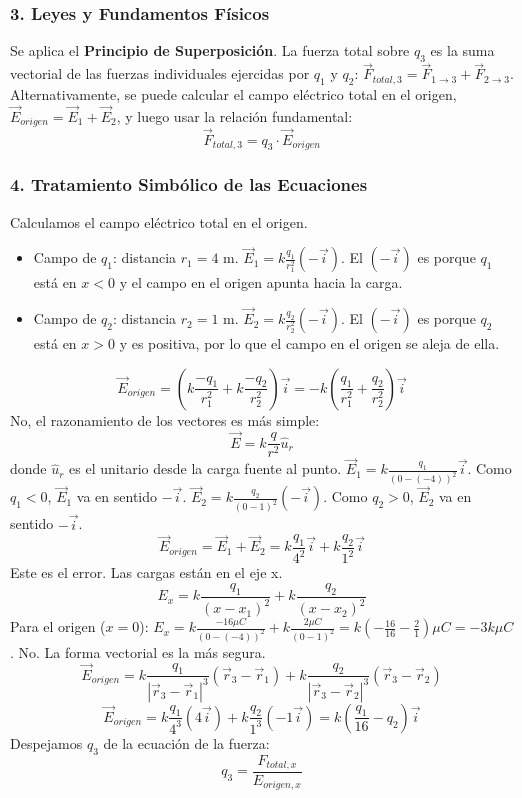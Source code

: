 \subsubsection*{3. Leyes y Fundamentos Físicos}
Se aplica el \textbf{Principio de Superposición}. La fuerza total sobre $q_3$ es la suma vectorial de las fuerzas individuales ejercidas por $q_1$ y $q_2$: $\vec{F}_{total,3} = \vec{F}_{1\to3} + \vec{F}_{2\to3}$.
Alternativamente, se puede calcular el campo eléctrico total en el origen, $\vec{E}_{origen} = \vec{E}_1 + \vec{E}_2$, y luego usar la relación fundamental:
$$ \vec{F}_{total,3} = q_3 \cdot \vec{E}_{origen} $$

\subsubsection*{4. Tratamiento Simbólico de las Ecuaciones}
Calculamos el campo eléctrico total en el origen.
\begin{itemize}
    \item Campo de $q_1$: distancia $r_1=4$ m. $\vec{E}_1 = k\frac{q_1}{r_1^2}(-\vec{i})$. El $(-\vec{i})$ es porque $q_1$ está en $x<0$ y el campo en el origen apunta hacia la carga.
    \item Campo de $q_2$: distancia $r_2=1$ m. $\vec{E}_2 = k\frac{q_2}{r_2^2}(-\vec{i})$. El $(-\vec{i})$ es porque $q_2$ está en $x>0$ y es positiva, por lo que el campo en el origen se aleja de ella.
\end{itemize}
$$ \vec{E}_{origen} = \left( k\frac{-q_1}{r_1^2} + k\frac{-q_2}{r_2^2} \right)\vec{i} = -k\left( \frac{q_1}{r_1^2} + \frac{q_2}{r_2^2} \right)\vec{i} $$
No, el razonamiento de los vectores es más simple:
$$ \vec{E} = k\frac{q}{r^2}\hat{u}_r $$
donde $\hat{u}_r$ es el unitario desde la carga fuente al punto.
$\vec{E}_1 = k\frac{q_1}{(0-(-4))^2}\vec{i}$. Como $q_1<0$, $\vec{E}_1$ va en sentido $-\vec{i}$.
$\vec{E}_2 = k\frac{q_2}{(0-1)^2}(-\vec{i})$. Como $q_2>0$, $\vec{E}_2$ va en sentido $-\vec{i}$.
$$ \vec{E}_{origen} = \vec{E}_1 + \vec{E}_2 = k\frac{q_1}{4^2}\vec{i} + k\frac{q_2}{1^2}\vec{i} $$
Este es el error. Las cargas están en el eje x.
$$ E_x = k\frac{q_1}{(x-x_1)^2} + k\frac{q_2}{(x-x_2)^2} $$
Para el origen ($x=0$):
$E_x = k\frac{-16\mu C}{(0 - (-4))^2} + k\frac{2\mu C}{(0-1)^2} = k(-\frac{16}{16} - \frac{2}{1})\mu C = -3k\mu C$.
No. La forma vectorial es la más segura.
$$ \vec{E}_{origen} = k \frac{q_1}{|\vec{r}_3-\vec{r}_1|^3}(\vec{r}_3-\vec{r}_1) + k \frac{q_2}{|\vec{r}_3-\vec{r}_2|^3}(\vec{r}_3-\vec{r}_2) $$
$$ \vec{E}_{origen} = k \frac{q_1}{4^3}(4\vec{i}) + k \frac{q_2}{1^3}(-1\vec{i}) = k \left(\frac{q_1}{16} - q_2\right)\vec{i} $$
Despejamos $q_3$ de la ecuación de la fuerza:
$$ q_3 = \frac{F_{total,x}}{E_{origen,x}} $$

